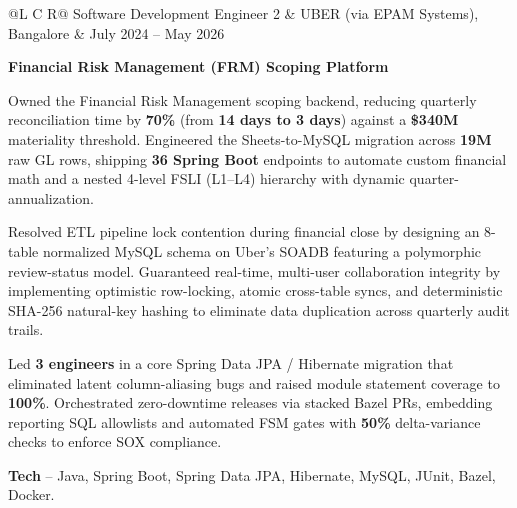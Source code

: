 
\noindent
\begin{tabularx}{\textwidth}{@{}L C R@{}}
\textcolor{role}{Software Development Engineer 2} & \textcolor{company}{UBER (via EPAM Systems), Bangalore} & \textcolor{date}{July 2024 -- May 2026}\\
\end{tabularx}
\vspace{-1.6ex}

\textcolor{Project}{\textbf{Financial Risk Management (FRM) Scoping Platform}}
\vspace{-0.88ex}
\begin{zitemize}
    \item Owned the Financial Risk Management scoping backend, reducing quarterly reconciliation time by \textbf{70\%} (from \textbf{14 days to 3 days}) against a \textbf{\$340M} materiality threshold. Engineered the Sheets-to-MySQL migration across \textbf{19M} raw GL rows, shipping \textbf{36 Spring Boot} endpoints to automate custom financial math and a nested 4-level FSLI (L1--L4) hierarchy with dynamic quarter-annualization.
    \item Resolved ETL pipeline lock contention during financial close by designing an 8-table normalized MySQL schema on Uber's SOADB featuring a polymorphic review-status model. Guaranteed real-time, multi-user collaboration integrity by implementing optimistic row-locking, atomic cross-table syncs, and deterministic SHA-256 natural-key hashing to eliminate data duplication across quarterly audit trails.
    \item Led \textbf{3 engineers} in a core Spring Data JPA / Hibernate migration that eliminated latent column-aliasing bugs and raised module statement coverage to \textbf{100\%}. Orchestrated zero-downtime releases via stacked Bazel PRs, embedding reporting SQL allowlists and automated FSM gates with \textbf{50\%} delta-variance checks to enforce SOX compliance.
    \item \textbf{Tech} -- Java, Spring Boot, Spring Data JPA, Hibernate, MySQL, JUnit, Bazel, Docker.
\end{zitemize}

